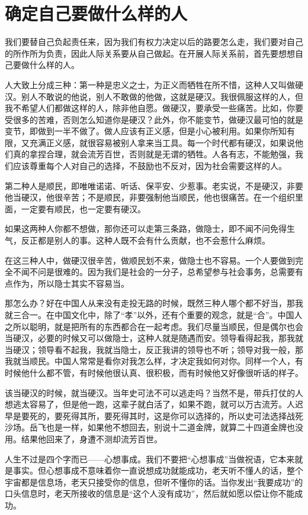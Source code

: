 \documentclass[fontset=fandol, a4paper, 12pt, openright]{ctexbook}
\begin{document}
\section{确定自己要做什么样的人}

我们要替自己负起责任来，因为我们有权力决定以后的路要怎么走，我们要对自己的所作所为负责，因此人际关系要从自己做起。在开展人际关系前，首先要想想自己要做什么样的人。

人大致上分成三种：第一种是忠义之士，为正义而牺牲在所不惜，这种人又叫做硬汉。别人不敢说的他说，别人不敢做的他做，这就是硬汉。我很佩服这样的人，但我不希望人们都做这样的人，除非他自愿。做硬汉，要承受一些痛苦。比如，你要受很多的苦难，否则怎么知道你是硬汉？此外，你不能变节，做硬汉最可怕的就是变节，即做到一半不做了。做人应该有正义感，但是小心被利用。如果你所知有限，又充满正义感，就很容易被别人拿来当工具。每一个时代都有硬汉，如果说他们真的拿捏合理，就会流芳百世，否则就是无谓的牺牲。人各有志，不能勉强，我们应该尊重每个人对自己的选择，不鼓励也不反对，因为社会需要这样的人。

第二种人是顺民，即唯唯诺诺、听话、保平安、少惹事。老实说，不是硬汉，非要他当硬汉，他很辛苦；不是顺民，非要强制他当顺民，他也很痛苦。在一个组织里面，一定要有顺民，也一定要有硬汉。

如果这两种人你都不想做，那你还可以走第三条路，做隐士，即不闻不问免得生气，反正都是别人的事。这种人既不会有什么贡献，也不会惹什么麻烦。

在这三种人中，做硬汉很辛苦，做顺民划不来，做隐士也不容易。一个人要做到完全不闻不问是很难的。因为我们是社会的一分子，总希望参与社会事务，总需要有点作为，所以隐士其实不容易当。

那怎么办？好在中国人从来没有走投无路的时候，既然三种人哪个都不好当，那我就三合一。在中国文化中，除了“孝”以外，还有个重要的观念，就是“合”。中国人之所以聪明，就是把所有的东西都合在一起考虑。我们尽量当顺民，但是偶尔也会当硬汉，必要的时候又可以做隐士，这种人就是随遇而安。领导看得起我，那我就当硬汉；领导看不起我，我就当隐士，反正我讲的领导也不听；领导对我一般，那我就当顺民。中国人常常是看你对我怎么样，才决定我如何对你。同样一个人，有时候他什么都不管，有时候他很认真、很积极，而有时候他又好像很听话的样子。

该当硬汉的时候，就当硬汉。当年史可法不可以逃走吗？当然不是，带兵打仗的人想逃太容易了，但是他一跑，这辈子就白活了，如果不跑，就可以万古流芳。人迟早是要死的，要死得其所，要死得其时，这是你可以选择的，所以史可法选择战死沙场。岳飞也是一样，如果他不想回去，别说十二道金牌，就算二十四道金牌也没用。结果他回来了，身遭不测却流芳百世。

人生不过是四个字而已——心想事成。我们不要把“心想事成”当做祝语，它本来就是事实。但心想事成不意味着你一直说想成功就能成功，老天听不懂人的话，整个宇宙都是信息场，老天只接受你的信息，但听不懂你的话。当你发出“我要成功”的口头信息时，老天所接收的信息是“这个人没有成功”，然后就如愿以偿让你不能成功。
\end{document}
